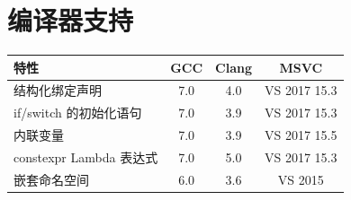 \section{编译器支持}

\begin{table}[H]
\centering
\begin{tabularx}{\textwidth}{X c c c}
\toprule
特性 & GCC & Clang & MSVC \\
\midrule
结构化绑定声明 & 7.0 & 4.0 & VS 2017 15.3 \\
if/switch 的初始化语句 & 7.0 & 3.9 & VS 2017 15.3 \\
内联变量 & 7.0 & 3.9 & VS 2017 15.5 \\
constexpr Lambda 表达式 & 7.0 & 5.0 & VS 2017 15.3 \\
嵌套命名空间 & 6.0 & 3.6 & VS 2015 \\
\bottomrule
\end{tabularx}
\end{table}
